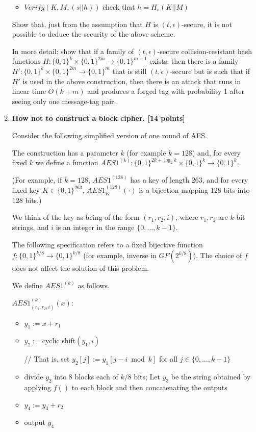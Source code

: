 \documentclass[12pt]{article}
\def\B{\{0,1\}}
\begin{document}
\begin{enumerate}
\begin{itemize}
\item $Verify(K,M,(s||h))$ check that $h=H_s(K||M)$
\end{itemize}

Show that, just from the assumption that $H$ is $(t,\epsilon)$-secure,
it is not possible to deduce the security of the above scheme.

In more detail: show that if a family of $(t,\epsilon)$-secure collision-resistant
hash functions $H: \B^k \times \B^{2m} \to \B^{m-1}$ exists, then
there is a family $H': \B^k \times \B^{2m} \to \B^{m}$ that is 
still $(t,\epsilon)$-secure  but is such that if $H'$ is used in the above
construction, then there is an attack that runs in linear time $O(k+m)$
and produces a forged tag with probability 1 after seeing only
one message-tag pair.

\iffalse

\item {\bf How not to construct a block cipher. [14 points]}

Consider the following simplified version of one round of AES.

The construction has a parameter $k$ (for example $k=128$) and,
for every fixed $k$ we define a function $AES1^{(k)} : \B^{2k + \log_2 k}
\times \B^k \to \B^k$. 

(For example, if $k=128$, $AES1^{(128)}$ has
a key of length $263$, and for every fixed key $K\in \B^{263}$,
$AES1^{(128)}_K(\cdot)$ is a bijection mapping 128 bits into 128 bits.)

We think of the key as being of the form
$(r_1,r_2,i)$, where $r_1,r_2$ are $k$-bit strings, and $i$
is an integer in the range $\{ 0,\ldots, k-1\}$. 

The following specification refers to a fixed bijective function $f: \B^{k/8} \to \B^{k/8}$ (for
example, inverse in $GF(2^{k/8})$). The choice of $f$ does not
affect the solution of this problem.

We define $AES1^{(k)}$ as follows.


$AES1^{(k)}_{(r_1,r_2,i)}  (x)$:
\begin{itemize}

\item $y_1 := x + r_1$
\item $y_2 := $cyclic$\_$shift$(y_1,i)$

// That is, set $y_2[j] := y_1[j-i \bmod k]$ for all $j\in \{0,\ldots,k-1\}$
\item divide $y_2$ into $8$ blocks each of $k/8$ bits; Let $y_3$ be the 
string obtained by applying $f()$ to each block and then concatenating
the outputs
\item $y_4 := y_3 + r_2$
\item output $y_4$


\end{itemize}
\end{enumerate}
\end{document}
